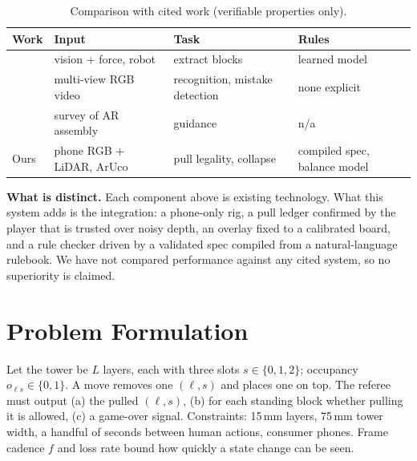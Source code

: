 \documentclass[conference,10pt]{IEEEtran}
\begin{document}
\begin{table}[t]
\caption{Comparison with cited work (verifiable properties only).}\label{tab:related}
\centering\footnotesize
\begin{tabular}{@{}p{1.5cm}p{1.9cm}p{2.3cm}p{2.3cm}@{}}
\toprule
Work & Input & Task & Rules \\
\midrule
\cite{fazeli2019} & vision + force, robot & extract blocks & learned model \\
\cite{sener2022} & multi-view RGB video & recognition, mistake detection & none explicit \\
\cite{wang2016} & survey of AR assembly & guidance & n/a \\
Ours & phone RGB + LiDAR, ArUco & pull legality, collapse & compiled spec, balance model \\
\bottomrule
\end{tabular}
\end{table}
\textbf{What is distinct.} Each component above is existing technology. What this system adds is the integration: a phone-only rig, a pull ledger confirmed by the player that is trusted over noisy depth, an overlay fixed to a calibrated board, and a rule checker driven by a validated spec compiled from a natural-language rulebook. We have not compared performance against any cited system, so no superiority is claimed.

\section{Problem Formulation}
Let the tower be $L$ layers, each with three slots $s\in\{0,1,2\}$; occupancy $o_{\ell s}\in\{0,1\}$. A move removes one $(\ell,s)$ and places one on top. The referee must output (a) the pulled $(\ell,s)$, (b) for each standing block whether pulling it is allowed, (c) a game-over signal. Constraints: 15\,mm layers, 75\,mm tower width, a handful of seconds between human actions, consumer phones. Frame cadence $f$ and loss rate bound how quickly a state change can be seen.
\end{document}
